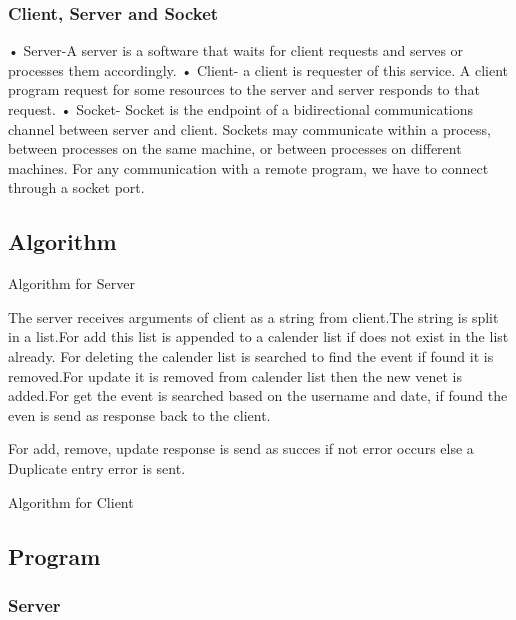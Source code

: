 \documentclass{article}
\begin{document}
 \subsubsection{Client, Server and Socket}
 • Server-A server is a software that waits for client requests and serves or processes them accordingly.\newline
• Client- a client is requester of this service. A client program request for some resources to the server and server responds to that request.\newline
• Socket- Socket is the endpoint of a bidirectional communications channel between server and client. Sockets may communicate within a process, between processes on the same machine, or between processes on different machines. For any communication with a remote program, we have to connect through a socket port.

  \subsection{Algorithm}
  \begin{algorithm}[H]
  
  \caption{Algorithm for Server}
  \end{algorithm}
  The server receives arguments of client as a string from client.The string is split in a list.For add this list is appended to a calender list if does not exist in the list already. For deleting the calender list is searched to find the event if found it is removed.For update it is removed from calender list then the new venet is added.For get the event is searched based on the username and date, if found the even is send as response back to the client.\newline 
  
  For add, remove, update response is send as succes if not error occurs else a Duplicate entry error is sent.
  
  \begin{algorithm}[H]
  
  \caption{Algorithm for Client}
  \end{algorithm}
  
 \newpage

  \subsection{Program}
\subsubsection{Server}
  
  \newpage
\end{document}
